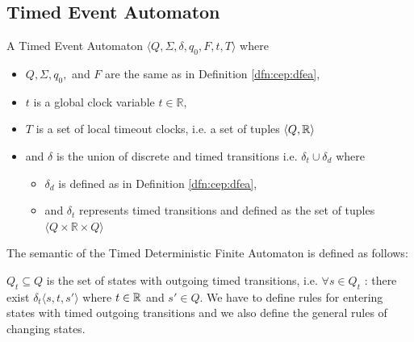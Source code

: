 		\subsection{Timed Event Automaton}
			\begin{dfn}
				\label{dfn:cep:TEA}
				A Timed Event Automaton $\langle Q,\Sigma,\delta,q_0, F, t, T \rangle$ where
				\begin{itemize}
					\item $Q, \Sigma, q_0,$ and $F$ are the same as in Definition \ref{dfn:cep:dfea},
					\item $t$ is a global clock variable $t \in \mathbb{R}$,
					\item $T$ is a set of local timeout clocks, i.e. a set of tuples $\langle Q, \mathbb{R} \rangle$
					\item and $\delta$ is the union of discrete and timed transitions i.e. $\delta_t \cup \delta_d$ where
					\begin{itemize}
						\item $\delta_d$ is defined as in Definition \ref{dfn:cep:dfea},
						\item and $\delta_t$ represents timed transitions and defined as the set of tuples $\langle Q \times \mathbb{R} \times Q \rangle$ 
					\end{itemize}
				\end{itemize}
			\end{dfn}
			
			The semantic of the Timed Deterministic Finite Automaton is defined as follows:
			
			
			
			$Q_t \subseteq Q$ is the set of states with outgoing timed transitions, 
			i.e. $\forall s \in Q_t$ : there exist $ \delta_t\langle s, t, s' \rangle$ where $t \in \mathbb{R}$ and $s' \in Q$.
			We have to define rules for entering states with timed outgoing transitions and we also define the general rules of changing states. 
			
